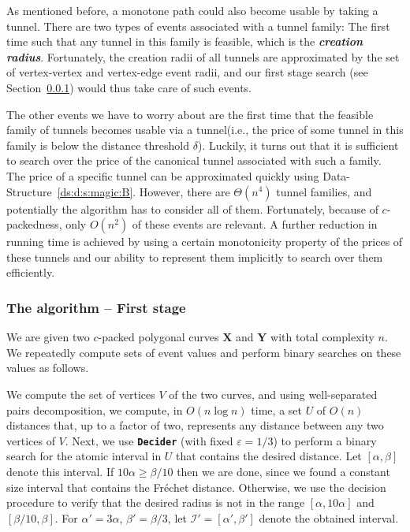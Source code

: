\documentclass[12pt]{article}
\makeatletter
\newcommand{\AlgorithmI}[1]{{\textcolor[named]{RedViolet}{\texttt{\bf{#1}}}}}
\newcommand{\Algorithm}[1]{{\AlgorithmI{#1}\index{algorithm!#1@{\AlgorithmI{#1}}}}}
\newcommand{\seclab}[1]{\label{sec:#1}}
\newcommand{\secref}[1]{Section~\ref{sec:#1}}
\newcommand{\dsref}[1]{Data-Structure~\ref{ds:#1}}
\newcommand{\emphic}[2]{\textcolor{blue25}{\textbf{\emph{#1}}}\index{#2}}
\newcommand{\emphi}[1]{\emphic{#1}{#1}}
\newcommand{\Frechet}{Fr\'{e}c{h}e{}t\xspace}\providecommand{\Arr}{\mathop{\mathrm{\EuScript{A}}}}
\newcommand{\cXBase}{X} \newcommand{\cYBase}{Y} \newcommand{\crvCBase}{{\pi}}
\newcommand{\cXOrig}{\pmb{\cXBase}}
\newcommand{\cYOrig}{\pmb{\cYBase}}
\providecommand{\eps}{{\varepsilon}}\renewcommand{\Re}{{\rm I\!\hspace{-0.025em} R}}
\newcommand{\DeciderFr}{\Algorithm{Decider}\xspace}
\newcommand{\tunnel}{tunnel\xspace}
\newcommand{\tunnels}{tunnels\xspace}
\newcommand{\Interval}{\mathcal{I}}
\numberwithin{figure}{section}
\numberwithin{equation}{section}
\makeatother
\begin{document}
As mentioned before, a monotone path could also become usable by
taking a tunnel.  There are two types of events associated with a
\tunnel family: The first time such that any \tunnel in this family is
feasible, which is the \emphi{creation radius}.  Fortunately, the
creation radii of all \tunnels are approximated by the set of
vertex-vertex and vertex-edge event radii, and our first stage search
(see \secref{first:stage}) would thus take care of such events.

The other events we have to worry about are the first time that the
feasible family of \tunnel{}s becomes usable via a \tunnel (i.e., the
price of some tunnel in this family is below the distance threshold
$\delta$).  Luckily, it turns out that it is sufficient to search over
the price of the canonical \tunnel{} associated with such a family.
The price of a specific \tunnel can be approximated quickly using
\dsref{d:s:magic:B}.  However, there are $\Theta(n^4)$ \tunnel
families, and potentially the algorithm has to consider all of them.
Fortunately, because of $c$-packedness, only $O(n^2)$ of these events
are relevant.  A further reduction in running time is achieved by
using a certain monotonicity property of the prices of these
\tunnel{}s and our ability to represent them implicitly to search over
them efficiently.



\subsubsection{The algorithm -- First stage}
\seclab{first:stage}

We are given two $c$-packed polygonal curves $\cXOrig$ and $\cYOrig$
with total complexity $n$.  We repeatedly compute sets of event values
and perform binary searches on these values as follows.

We compute the set of vertices $V$ of the two curves, and using
well-separated pairs decomposition, we compute, in $O(n \log n)$ time,
a set $U$ of $O(n)$ distances that, up to a factor of two, represents
any distance between any two vertices of $V$. Next, we use \DeciderFr
(with fixed $\eps = 1/3$) to perform a binary search for the atomic
interval in $U$ that contains the desired distance. Let $[\alpha,
\beta]$ denote this interval.  If $10\alpha \geq \beta/10$ then we are
done, since we found a constant size interval that contains the
\Frechet distance. Otherwise, we use the decision procedure to verify
that the desired radius is not in the range $[\alpha, 10\alpha]$ and
$[\beta/10, \beta]$.  For $\alpha' = 3\alpha$, $\beta' = \beta/3$, let
$\Interval'=[\alpha',\beta']$ denote the obtained interval.
\end{document}
